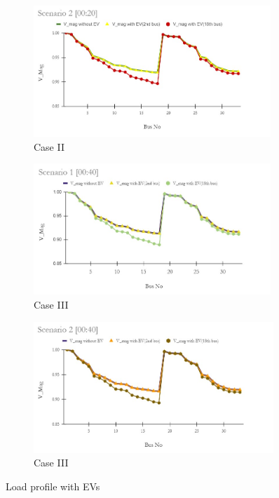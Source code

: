 \begin{figure}[!h]
		\begin{subfigure}{.5\textwidth}
			\centering
			\includegraphics[width=.97\linewidth,height= 4.95cm]{./Figures/sc 2 (00_20)}
			\caption{Case II}
			\label{fig:LF2b}
		\end{subfigure}
		\begin{subfigure}{.5\textwidth}
			\centering
			\includegraphics[width=.97\linewidth,height= 4.95cm]{./Figures/sc 1 (00_40)}
			\caption{Case III}
			\label{fig:LFc}
		\end{subfigure}
		\begin{subfigure}{.5\textwidth}
			\centering
			\includegraphics[width=.97\linewidth,height= 4.95cm]{./Figures/sc 2 (00_40)}
			\caption{Case III}
			\label{fig:LF2c}
		\end{subfigure}
		\caption{ Load profile with EVs }
		\label{fig:loadprofile-scenario1}
	\end{figure} 
	
